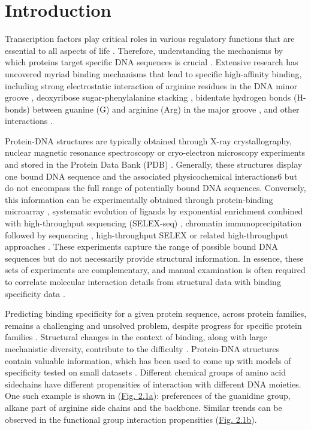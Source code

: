 \section{Introduction} 

Transcription factors play critical roles in various regulatory functions that are essential to all aspects of life \citep{Spitz2012}. Therefore, understanding the mechanisms by which proteins target specific DNA sequences is crucial \citep{Zhao2009}. Extensive research has uncovered myriad binding mechanisms that lead to specific high-affinity binding, including strong electrostatic interaction of arginine residues in the DNA minor groove \citep{rohs2009role}, deoxyribose sugar-phenylalanine stacking \citep{stirnimann2010structural}, bidentate hydrogen bonds (H-bonds) between guanine (G) and arginine (Arg) in the major groove \citep{Helene1977}, and other interactions \citep{Rohs2010,Schildbach1999,Seeman1976}.
\par
Protein-DNA structures are typically \citep{Garvie2001} obtained through X-ray crystallography, nuclear magnetic resonance spectroscopy or cryo-electron microscopy experiments and stored in the Protein Data Bank (PDB) \citep{berman2000protein}. Generally, these structures display one bound DNA sequence and the associated physicochemical interactions6 but do not encompass the full range of potentially bound DNA sequences. Conversely, this information can be experimentally obtained through protein-binding microarray \citep{Berger2009}, systematic evolution of ligands by exponential enrichment combined with high-throughput sequencing (SELEX-seq) \citep{Slattery2011}, chromatin immunoprecipitation followed by sequencing \citep{Park2009}, high-throughput SELEX \citep{Jolma2013} or related high-throughput approaches \citep{Slattery2014}. These experiments capture the range of possible bound DNA sequences but do not necessarily provide structural information. In essence, these sets of experiments are complementary, and manual examination is often required to correlate molecular interaction details from structural data with binding specificity data \citep{rohs2009role}.
\par
Predicting binding specificity for a given protein sequence, across protein families, remains a challenging and unsolved problem, despite progress for specific protein families \citep{persikov2014novo, Wetzel2022, persikov2009predicting, Sofia2022, Meseguer2020, molparia2010zif, christensen2012recognition, Yanover2011}. Structural changes in the context of binding, along with large mechanistic diversity, contribute to the difficulty \citep{Slattery2014, Chiu2023}. Protein-DNA structures contain valuable information, which has been used to come up with models of specificity tested on small datasets \citep{morozov2005protein}. Different chemical groups of amino acid sidechains have different propensities of interaction with different DNA moieties. One such example is shown in (\hyperref[fig:arg]{Fig. 2.1a}): preferences of the guanidine group, alkane part of arginine side chains and the backbone. Similar trends can be observed in the functional group \citep{Chiu2023} interaction propensities (\hyperref[fig:arg]{Fig. 2.1b}). 
